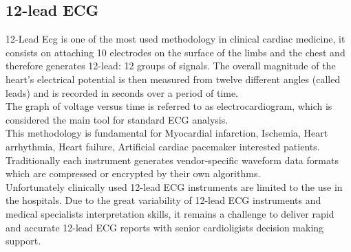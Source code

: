 \subsection{12-lead ECG}
12-Lead Ecg is one of the most used methodology in clinical cardiac medicine, it consists on attaching 10 electrodes on the surface of the limbs and the chest and therefore generates 12-lead: 12 groups of signals. The overall magnitude of the heart's electrical potential is then measured from twelve different angles (called leads) and is recorded in seconds over a period of time.\\
The graph of voltage versus time is referred to as electrocardiogram, which is considered the main tool for standard ECG analysis. \cite{electrocardiography_it} \cite{electrocardiography_en}\\
This methodology is fundamental for Myocardial infarction, Ischemia, Heart arrhythmia, Heart failure, Artificial cardiac pacemaker interested patients. Traditionally each instrument generates vendor-specific waveform data formats which are compressed or encrypted by their own algorithms.\\
Unfortunately clinically used 12-lead ECG instruments are limited to the use in the hospitals. Due to the great variability of 12-lead ECG instruments and medical specialists interpretation skills, it remains a challenge to deliver rapid and accurate 12-lead ECG reports with senior cardioligists decision making support.\cite{Hsieh2012}


